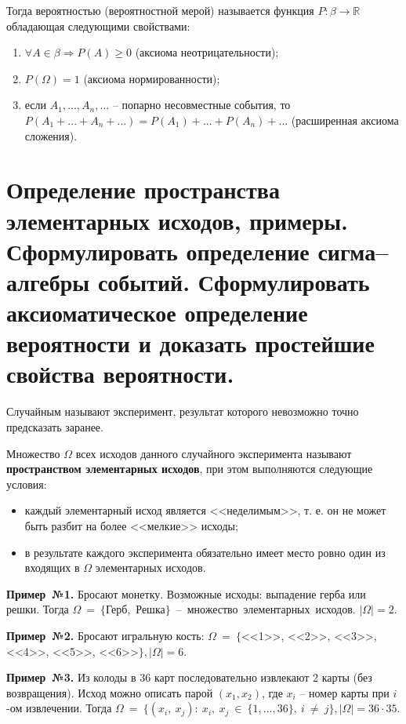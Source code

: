 Тогда вероятностью (вероятностной мерой) называется функция $P: \beta \rightarrow \mathbb{R}$ обладающая следующими свойствами: 

\begin{enumerate}[label=\arabic*)]
	\item $\forall A \in \beta \Rightarrow P(A) \geq 0$ (аксиома неотрицательности);
	\item $P(\Omega) = 1$ (аксиома нормированности);
	\item если $A_1, ..., A_n,...$ -- попарно несовместные события, то $P(A_1 +...+A_n +...) = P(A_1)+...+P(A_n)+...$ (расширенная аксиома сложения).
\end{enumerate}

\section{Определение пространства элементарных исходов, примеры. Сформулировать определение сигма--алгебры событий. Сформулировать аксиоматическое определение вероятности и доказать простейшие свойства вероятности.}

Случайным называют эксперимент, результат которого невозможно точно предсказать заранее.

Множество $\Omega$ всех исходов данного случайного эксперимента называют \textbf{пространством элементарных исходов}, при этом выполняются следующие условия: 

\begin{itemize}
	\item каждый элементарный исход является <<неделимым>>, т. е. он не может быть разбит на более <<мелкие>> исходы;
	
	\item в результате каждого эксперимента обязательно имеет место ровно один из входящих в $\Omega$ элементарных исходов.
\end{itemize}

\textbf{Пример~№1.} Бросают монетку. Возможные исходы: выпадение герба или решки. Тогда $\Omega~=~\{$Герб,~Решка$\}$~--~множество~элементарных~исходов. $|\Omega| = 2$.

\textbf{Пример~№2.} Бросают игральную кость: $\Omega~=~\{$<<1>>, <<2>>, <<3>>, <<4>>, <<5>>, <<6>>$\}, |\Omega| = 6.$

\textbf{Пример~№3.} Из колоды в 36 карт последовательно извлекают 2 карты (без возвращения). Исход можно описать парой $(x_1, x_2)$, где $x_i$ -- номер карты при $i$-ом извлечении. Тогда $\Omega~=~\{(x_i,~x_j):~x_i,~x_j~\in~\{1, ..., 36\},~i~\neq~j\}, |\Omega| = 36 \cdot 35.$ 

